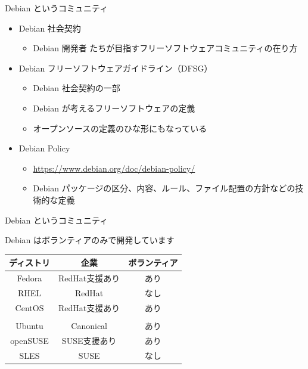 \begin{frame}{Debian というコミュニティ}

\begin{itemize}
\item Debian 社会契約
  \begin{itemize}
  \item Debian 開発者 たちが目指すフリーソフトウェアコミュニティの在り方
  \end{itemize}
\item Debian フリーソフトウェアガイドライン（DFSG）
  \begin{itemize}
  \item Debian 社会契約の一部
  \item Debian が考えるフリーソフトウェアの定義
  \item オープンソースの定義のひな形にもなっている
  \end{itemize}
\item Debian Policy
  \begin{itemize}
  \item \url{https://www.debian.org/doc/debian-policy/}
  \item Debian パッケージの区分、内容、ルール、ファイル配置の方針などの技術的な定義
  \end{itemize}
\end{itemize}

\end{frame}


\begin{frame}{Debian というコミュニティ}

Debian はボランティアのみで開発しています

\begin{table}[htb]
  \begin{tabular}{|c|c|c|}
    \hline
    ディストリ & 企業 & ボランティア \\ \hline
    Fedora & RedHat支援あり & あり  \\ \hline
    RHEL & RedHat & なし  \\ \hline
    CentOS & RedHat支援あり & あり \\ \hline
    \color{red}{Debian}  & \color{red}{なし} & \color{red}{あり} \\ \hline
    Ubuntu  & Canonical & あり \\ \hline
    openSUSE & SUSE支援あり & あり \\ \hline
    SLES & SUSE & なし \\ \hline
  \end{tabular}
\end{table}

\end{frame}



